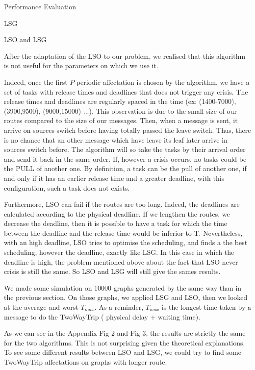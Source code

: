 \documentclass[a4paper,10pt]{report}
\begin{document}
\begin{chapter}{Performance Evaluation}
\begin{section}{LSG}
\begin{subsection}{LSO and LSG}

After the adaptation of the LSO to our problem, we realised that this algorithm is not useful for the parameters on which we use it. 

Indeed, once the first $P$-periodic affectation is chosen
by the algorithm, we have a set of tasks with release times and deadlines that does not trigger any crisis.
The release times and deadlines are regularly spaced in the time (ex: (1400-7000), (3900,9500), (9000,15000) ...).
This observation is due to the small size of our routes compared to the size of our messages. Then, when a message is sent, it arrive on sources switch before having totally passed the leave switch. Thus, there is no chance that an other message which have leave its leaf later arrive in sources switch before.
The algorithm will so take the tasks by their arrival order and send it back in the same order. If, however a crisis occurs, no tasks could be the PULL
of another one. By definition, a task can be the pull of another one, if and only if it has an earlier release time and a greater deadline, with this configuration, such a task does not exists.

Furthermore, LSO can fail if the routes are too long. Indeed, the deadlines are calculated according to the physical deadline. If we lengthen the routes, we decrease the deadline, then it is possible to have a task for which the time between the deadline and the release time would be inferior to T.
Nevertheless, with an high deadline, LSO tries to optimise the scheduling, and finds a the best scheduling, however the deadline, exactly like LSG.
In this case in which the deadline is high, the problem mentioned above about the fact that LSO never crisis is still the same. So LSO and LSG will still give the sames results.

We made some simulation on 10000 graphs generated by the same way than in the previous section.
On those graphs, we applied LSG and LSO, then we looked at the average and worst $T_{max}$.
As a reminder, $T_{max}$ is the longest time taken by a message to do the TwoWayTrip ( physical delay + waiting time).

As we can see in the Appendix Fig 2 and Fig 3, the results are strictly the same for the two algorithms. This is not surprising given the
theoretical explanations.
To see some different results between LSO and LSG, we could try to find some TwoWayTrip affectations on graphs with longer route.


\end{subsection}
\end{section}
\end{chapter}
\end{document}
